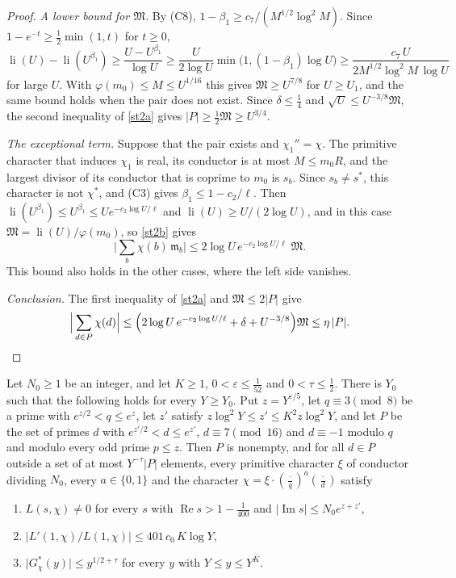 \begin{proof}
\emph{A lower bound for $\mathfrak M$.} By (C8), $1-\beta_1\ge c_7/(M^{1/2}\log^2M)$. Since $1-e^{-t}\ge\frac12\min(1,t)$ for $t\ge0$,
\[
\operatorname{li}(U)-\operatorname{li}(U^{\beta_1})\ge\frac{U-U^{\beta_1}}{\log U}\ge\frac U{2\log U}\min\big(1,(1-\beta_1)\log U\big)\ge\frac{c_7\,U}{2M^{1/2}\log^2M\,\log U}
\]
for large $U$. With $\varphi(m_0)\le M\le U^{1/16}$ this gives $\mathfrak M\ge U^{7/8}$ for $U\ge U_1$, and the same bound holds when the pair does not exist. Since $\delta\le\frac14$ and $\sqrt U\le U^{-3/8}\mathfrak M$, the second inequality of \eqref{st2a} gives $\lvert P\rvert\ge\frac12\mathfrak M\ge U^{3/4}$.

\emph{The exceptional term.} Suppose that the pair exists and $\chi_1''=\chi$. The primitive character that induces $\chi_1$ is real, its conductor is at most $M\le m_0R$, and the largest divisor of its conductor that is coprime to $m_0$ is $s_b$. Since $s_b\ne s^\ast$, this character is not $\chi^\ast$, and (C3) gives $\beta_1\le1-c_2/\ell$. Then $\operatorname{li}(U^{\beta_1})\le U^{\beta_1}\le Ue^{-c_2\log U/\ell}$ and $\operatorname{li}(U)\ge U/(2\log U)$, and in this case $\mathfrak M=\operatorname{li}(U)/\varphi(m_0)$, so \eqref{st2b} gives
\[
\Big\lvert\sum_b\chi(b)\,\mathfrak m_b\Big\rvert\le2\log U\,e^{-c_2\log U/\ell}\;\mathfrak M .
\]
This bound also holds in the other cases, where the left side vanishes.

\emph{Conclusion.} The first inequality of \eqref{st2a} and $\mathfrak M\le2\lvert P\rvert$ give
\[
\Big\lvert\sum_{d\in P}\chi(d)\Big\rvert\le\Big(2\log U\,e^{-c_2\log U/\ell}+\delta+U^{-3/8}\Big)\mathfrak M\le\eta\,\lvert P\rvert .\qedhere
\]
\end{proof}

\begin{theorem}\label{stage2}
Let $N_0\ge1$ be an integer, and let $K\ge1$, $0<\varepsilon\le\frac1{52}$ and $0<\tau\le\frac12$. There is $Y_0$ such that the following holds for every $Y\ge Y_0$. Put $z=Y^{\varepsilon/5}$, let $q\equiv3\pmod8$ be a prime with $e^{z/2}<q\le e^z$, let $z'$ satisfy $z\log^2Y\le z'\le K^2z\log^2Y$, and let $P$ be the set of primes $d$ with $e^{z'/2}<d\le e^{z'}$, $d\equiv7\pmod{16}$ and $d\equiv-1$ modulo $q$ and modulo every odd prime $p\le z$. Then $P$ is nonempty, and for all $d\in P$ outside a set of at most $Y^{-\tau}\lvert P\rvert$ elements, every primitive character $\xi$ of conductor dividing $N_0$, every $a\in\{0,1\}$ and the character $\chi=\xi\cdot(\frac{\cdot}{q})^a(\frac{\cdot}{d})$ satisfy
\begin{enumerate}
\item[(i)] $L(s,\chi)\ne0$ for every $s$ with $\operatorname{Re}s>1-\frac1{400}$ and $\lvert\operatorname{Im}s\rvert\le N_0e^{z+z'}$,
\item[(ii)] $\lvert L'(1,\chi)/L(1,\chi)\rvert\le401\,c_0\,K\log Y$,
\item[(iii)] $\lvert G^\ast_\chi(y)\rvert\le y^{1/2+\tau}$ for every $y$ with $Y\le y\le Y^K$.
\end{enumerate}
\end{theorem}

